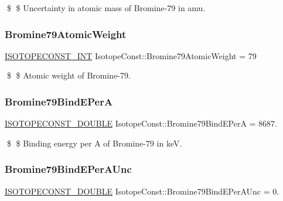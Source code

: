 \$ \$ Uncertainty in atomic mass of Bromine-\/79 in amu. \mbox{\label{group___isotope_const-_bromine-_br79_gaac2d291cc08950fb033dade391f5f0fb}} 
\subsubsection{\texorpdfstring{Bromine79\+Atomic\+Weight}{Bromine79AtomicWeight}}
{\footnotesize\ttfamily \mbox{\hyperlink{group___isotope_const-_macros_ga5f18360b3e99483a35c32d789e62621c}{I\+S\+O\+T\+O\+P\+E\+C\+O\+N\+S\+T\+\_\+\+I\+NT}} Isotope\+Const\+::\+Bromine79\+Atomic\+Weight = 79}

\$ \$ Atomic weight of Bromine-\/79. \mbox{\label{group___isotope_const-_bromine-_br79_gaaba1caa3d3165822c00c816ab8df9949}} 
\subsubsection{\texorpdfstring{Bromine79\+Bind\+E\+PerA}{Bromine79BindEPerA}}
{\footnotesize\ttfamily \mbox{\hyperlink{group___isotope_const-_macros_ga8f45a7272ce02c0b4c65c44636ed719a}{I\+S\+O\+T\+O\+P\+E\+C\+O\+N\+S\+T\+\_\+\+D\+O\+U\+B\+LE}} Isotope\+Const\+::\+Bromine79\+Bind\+E\+PerA = 8687.}

\$ \$ Binding energy per A of Bromine-\/79 in keV. \mbox{\label{group___isotope_const-_bromine-_br79_ga288558049031e834c11e33d2ce5a9409}} 
\subsubsection{\texorpdfstring{Bromine79\+Bind\+E\+Per\+A\+Unc}{Bromine79BindEPerAUnc}}
{\footnotesize\ttfamily \mbox{\hyperlink{group___isotope_const-_macros_ga8f45a7272ce02c0b4c65c44636ed719a}{I\+S\+O\+T\+O\+P\+E\+C\+O\+N\+S\+T\+\_\+\+D\+O\+U\+B\+LE}} Isotope\+Const\+::\+Bromine79\+Bind\+E\+Per\+A\+Unc = 0.}

